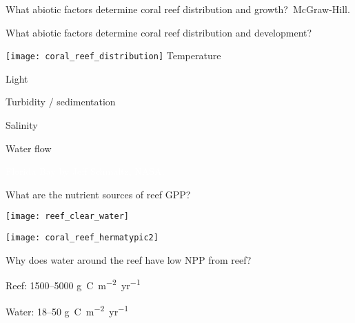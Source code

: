 \documentclass[t,handout]{beamer}  %
\begin{document}
{
\begin{frame}[b]{What abiotic factors determine coral reef distribution and growth?}
\tiny\textcopyright\,McGraw-Hill.
\end{frame}
}

\begin{frame}[t]{What abiotic factors determine coral reef distribution and development?}
	\begin{multicols}{2}
		\texttt{[image: coral\_reef\_distribution]}
	\columnbreak
		\hangpara Temperature \pause
		
		\hangpara Light \pause
		
		\hangpara Turbidity / sedimentation \pause
		
		\hangpara Salinity \pause
		
		\hangpara Water flow
	\end{multicols}
\end{frame}


{
\begin{frame}[b]

\tiny\textcolor{white}{Florida Bay by Jeff Schmaltz, NASA.}
\end{frame}
}


\begin{frame}[t]{What are the nutrient sources of reef GPP?}
	\begin{multicols}{2}
		\begin{center}
		\texttt{[image: reef\_clear\_water]}
		
		\vspace*{1ex}
		
		\texttt{[image: coral\_reef\_hermatypic2]}
		\end{center}
		
	\columnbreak
	
		\hangpara\parbox[t]{1.5in}{\raggedright Why does water around the reef have low NPP from reef?}
		
		\hangpara Reef: 1500–5000 \si{\gram~C.m^{-2}.yr^{-1}}
		
		\hangpara Water: 18–50 \si{\gram~C.m^{-2}.yr^{-1}}

	\end{multicols}
\end{frame}
\end{document}

